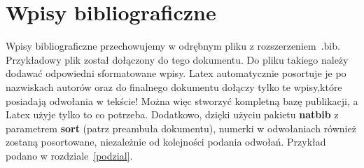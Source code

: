 \section{Wpisy bibliograficzne}

Wpisy bibliograficzne przechowujemy w odrębnym pliku z rozszerzeniem\ .bib. Przykładowy plik został dołączony do tego dokumentu. Do pliku takiego należy dodawać odpowiedni sformatowane wpisy. Latex automatycznie posortuje je po nazwiskach autorów oraz do finalnego dokumentu dołączy tylko te wpisy,które posiadają odwołania w tekście! Można więc stworzyć kompletną bazę publikacji, a Latex użyje tylko to co potrzeba. Dodatkowo, dzięki użyciu pakietu \textbf{natbib} z parametrem \textbf{sort} (patrz preambuła dokumentu), numerki w odwołaniach również zostaną posortowane, niezależnie od kolejności podania odwołań. Przykład podano w rozdziale~\ref{podzial}.